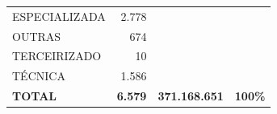 \documentclass{article}
\begin{document}
\begin{longtable}[c]{m{7cm}|m{2.5cm}|m{2.5cm}|m{2.5cm}}
\multicolumn{1}{L{7cm}|}{ \hspace{3em} ESPECIALIZADA} & \multicolumn{1}{r|}{ 2.778} &  & \\
\multicolumn{1}{L{7cm}|}{ \hspace{3em} OUTRAS} & \multicolumn{1}{r|}{   674} &  & \\
\multicolumn{1}{L{7cm}|}{ \hspace{3em} TERCEIRIZADO} & \multicolumn{1}{r|}{    10} &  & \\
\multicolumn{1}{L{7cm}|}{ \hspace{3em} TÉCNICA} & \multicolumn{1}{r|}{ 1.586} &  & \\
\hline \hline 
\multicolumn{1}{L{7cm}|}{ \textbf{TOTAL}} & \multicolumn{1}{r|}{ \textbf{6.579}} & \multicolumn{1}{r|}{ \textbf{371.168.651}} & \multicolumn{1}{r}{ \textbf{100\%}} \\
\end{longtable}
\newpage
\end{document}
